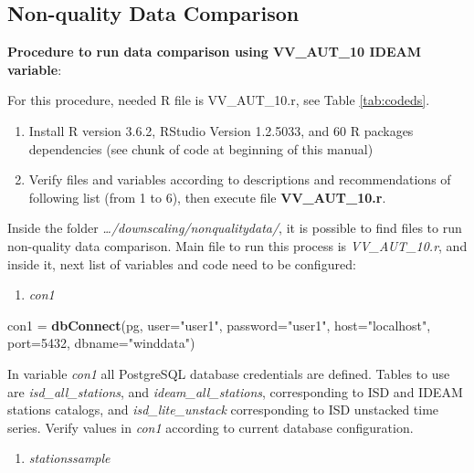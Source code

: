 \documentclass[12pt,oneside]{reedthesis}
\newenvironment{Shaded}{\begin{snugshade}}{\end{snugshade}}
\newcommand{\DataTypeTok}[1]{\textcolor[rgb]{0.13,0.29,0.53}{#1}}
\newcommand{\DecValTok}[1]{\textcolor[rgb]{0.00,0.00,0.81}{#1}}
\newcommand{\KeywordTok}[1]{\textcolor[rgb]{0.13,0.29,0.53}{\textbf{#1}}}
\newcommand{\NormalTok}[1]{#1}
\newcommand{\StringTok}[1]{\textcolor[rgb]{0.31,0.60,0.02}{#1}}
\providecommand{\tightlist}{%
  \setlength{\itemsep}{0pt}\setlength{\parskip}{0pt}}
\begin{document}
\hypertarget{non-quality-data-comparison}{%
\subsection{Non-quality Data Comparison}\label{non-quality-data-comparison}}

\textbf{Procedure to run data comparison using VV\_AUT\_10 IDEAM variable}:

For this procedure, needed R file is VV\_AUT\_10.r, see Table \ref{tab:codeds}.
\begin{enumerate}
\def\labelenumi{\arabic{enumi}.}
\item
  Install R version 3.6.2, RStudio Version 1.2.5033, and 60 R packages dependencies (see chunk of code at beginning of this manual)
\item
  Verify files and variables according to descriptions and recommendations of following list (from 1 to 6), then execute file \textbf{VV\_AUT\_10.r}.
\end{enumerate}
Inside the folder \emph{\ldots/downscaling/nonqualitydata/}, it is possible to find files to run non-quality data comparison. Main file to run this process is \emph{VV\_AUT\_10.r}, and inside it, next list of variables and code need to be configured:
\begin{enumerate}
\def\labelenumi{\arabic{enumi}.}
\tightlist
\item
  \emph{con1}
\end{enumerate}
\scriptsize

\vspace{0.4cm}
\begin{Shaded}
\begin{Highlighting}[]
\NormalTok{      con1 =}\StringTok{ }\KeywordTok{dbConnect}\NormalTok{(pg, }\DataTypeTok{user=}\StringTok{"user1"}\NormalTok{, }\DataTypeTok{password=}\StringTok{"user1"}\NormalTok{, }\DataTypeTok{host=}\StringTok{"localhost"}\NormalTok{, }\DataTypeTok{port=}\DecValTok{5432}\NormalTok{, }\DataTypeTok{dbname=}\StringTok{"winddata"}\NormalTok{)}
\end{Highlighting}
\end{Shaded}
\normalsize

In variable \emph{con1} all PostgreSQL database credentials are defined. Tables to use are \emph{isd\_all\_stations}, and \emph{ideam\_all\_stations}, corresponding to ISD and IDEAM stations catalogs, and \emph{isd\_lite\_unstack} corresponding to ISD unstacked time series. Verify values in \emph{con1} according to current database configuration.
\begin{enumerate}
\def\labelenumi{\arabic{enumi}.}
\setcounter{enumi}{1}
\tightlist
\item
  \emph{stationssample}
\end{enumerate}
\scriptsize
\end{document}

